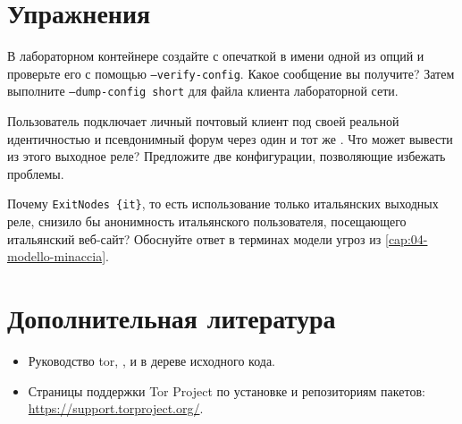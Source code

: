 \section*{Упражнения}

\begin{esercizio}[1]\label{es:17-verifica}
В лабораторном контейнере создайте  с опечаткой в имени одной из опций и проверьте его с помощью \texttt{--verify-config}. Какое сообщение вы получите? Затем выполните \texttt{--dump-config short} для файла  клиента лабораторной сети.
\end{esercizio}

\begin{esercizio}[2]\label{es:17-isolamento}
Пользователь подключает личный почтовый клиент под своей реальной идентичностью и псевдонимный форум через один и тот же . Что может вывести из этого выходное реле? Предложите две конфигурации, позволяющие избежать проблемы.
\end{esercizio}

\begin{esercizio}[2]\label{es:17-exitnodes}
Почему \texttt{ExitNodes \{it\}}, то есть использование только итальянских выходных реле, снизило бы анонимность итальянского пользователя, посещающего итальянский веб-сайт? Обоснуйте ответ в терминах модели угроз из \cref{cap:04-modello-minaccia}.
\end{esercizio}

\section*{Дополнительная литература}
\begin{itemize}
  \item Руководство tor, , и  в дереве исходного кода.
  \item Страницы поддержки Tor Project по установке и репозиториям пакетов: \url{https://support.torproject.org/}.
\end{itemize}
